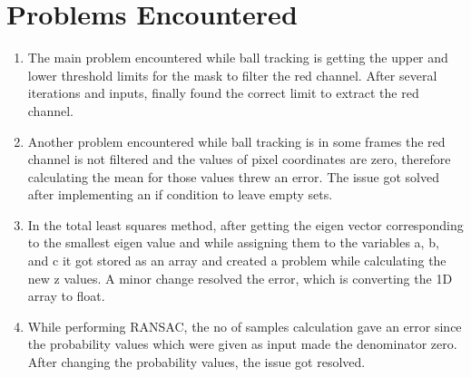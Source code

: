 \section{Problems Encountered}
\begin{enumerate}
    \item The main problem encountered while ball tracking is getting the upper and lower threshold limits for the mask to filter the red channel. After several iterations and inputs, finally found the correct limit to extract the red channel.
    \item Another problem encountered while ball tracking is in some frames the red channel is not filtered and the values of pixel coordinates are zero, therefore calculating the mean for those values threw an error. The issue got solved after implementing an if condition to leave empty sets.
    \item In the total least squares method, after getting the eigen vector corresponding to the smallest eigen value and while assigning them to the variables a, b, and c it got stored as an array and created a problem while calculating the new z values. A minor change resolved the error, which is converting the 1D array to float.
    \item While performing RANSAC, the no of samples calculation gave an error since the probability values which were given as input made the denominator zero. After changing the probability values, the issue got resolved.
\end{enumerate}